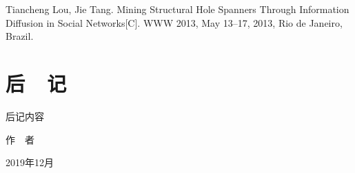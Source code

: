 \documentclass[utf8, a4paper,12pt, svgnames, twoside]{book}
\begin{document}

\begin{thebibliography}{参考文献}
 Tiancheng Lou, Jie Tang. Mining Structural Hole Spanners Through Information Diffusion in Social Networks[C]. WWW 2013, May 13–17, 2013, Rio de Janeiro, Brazil.

\end{thebibliography}

\chapter{后~~记}

后记内容

\begin{flushright}
作~~者~~~~~~~~~

2019年12月~~~~~
\end{flushright}
\end{document}
